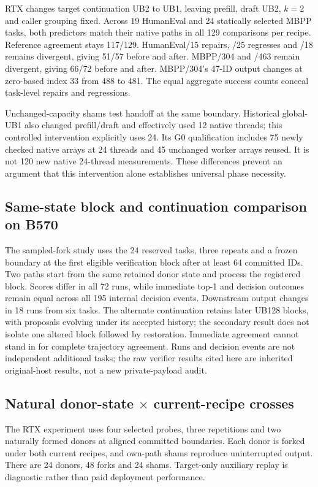 RTX changes target continuation UB2 to UB1, leaving prefill, draft UB2, $k=2$ and caller grouping fixed. Across 19 HumanEval and 24 statically selected MBPP tasks, both predictors match their native paths in all 129 comparisons per recipe. Reference agreement stays 117/129. HumanEval/15 repairs, /25 regresses and /18 remains divergent, giving 51/57 before and after. MBPP/304 and /463 remain divergent, giving 66/72 before and after. MBPP/304's 47-ID output changes at zero-based index 33 from 488 to 481. The equal aggregate success counts conceal task-level repairs and regressions.

Unchanged-capacity shams test handoff at the same boundary. Historical global-UB1 also changed prefill/draft and effectively used 12 native threads; this controlled intervention explicitly uses 24. Its G0 qualification includes 75 newly checked native arrays at 24 threads and 45 unchanged worker arrays reused. It is not 120 new native 24-thread measurements. These differences prevent an argument that this intervention alone establishes universal phase necessity.

\subsection{Same-state block and continuation comparison on B570}
\label{supp:b570_single_block}
The sampled-fork study uses the 24 reserved tasks, three repeats and a frozen boundary at the first eligible verification block after at least 64 committed IDs. Two paths start from the same retained donor state and process the registered block. Scores differ in all 72 runs, while immediate top-1 and decision outcomes remain equal across all 195 internal decision events. Downstream output changes in 18 runs from six tasks. The alternate continuation retains later UB128 blocks, with proposals evolving under its accepted history; the secondary result does not isolate one altered block followed by restoration. Immediate agreement cannot stand in for complete trajectory agreement. Runs and decision events are not independent additional tasks; the raw verifier results cited here are inherited original-host results, not a new private-payload audit.

\subsection{Natural donor-state \texorpdfstring{$\times$}{x} current-recipe crosses}
\label{supp:natural_crosses}
The RTX experiment uses four selected probes, three repetitions and two naturally formed donors at aligned committed boundaries. Each donor is forked under both current recipes, and own-path shams reproduce uninterrupted output. There are 24 donors, 48 forks and 24 shams. Target-only auxiliary replay is diagnostic rather than paid deployment performance.

